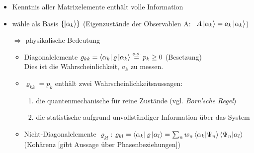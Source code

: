 \begin{itemize}     
    \item Kenntnis aller Matrixelemente enthält volle Information
    \item wähle als Basis $\{\ket{\alpha_k}\}$ (Eigenzustände der Observablen A: \ $A \ket{\alpha_k} = a_k \ket{\alpha_k}$)
    \item [$\Rightarrow$] physikalische Bedeutung
    \begin{itemize}
        \item Diagonalelemente $\varrho_{kk} = \bra{\alpha_k} \varrho \ket{\alpha_k} \stackrel{s.o.}{=} p_k \geq 0$ (Besetzung)\\
        Dies ist die Wahrscheinlichkeit, $a_k$ zu messen.
        \item $\varrho_{kk} = p_k$ enthält zwei Wahrscheinlichkeitsaussagen:
        \begin{enumerate}
            \item die quantenmechanische für reine Zustände (vgl. \emph{Born'sche Regel})
            \item die statistische aufgrund unvollständiger Information über das System 
        \end{enumerate}
        \item Nicht-Diagonalelemente $\varrho_{kl}$:  $\varrho_{kl} = \bra{\alpha_k} \varrho \ket{\alpha_l} = \sum_n w_n \bra{\alpha_k}\ket{\Psi_n}\bra{\Psi_n}\ket{\alpha_l}$ (Kohärenz [gibt Aussage über Phasenbeziehungen])
    \end{itemize}
\end{itemize}

